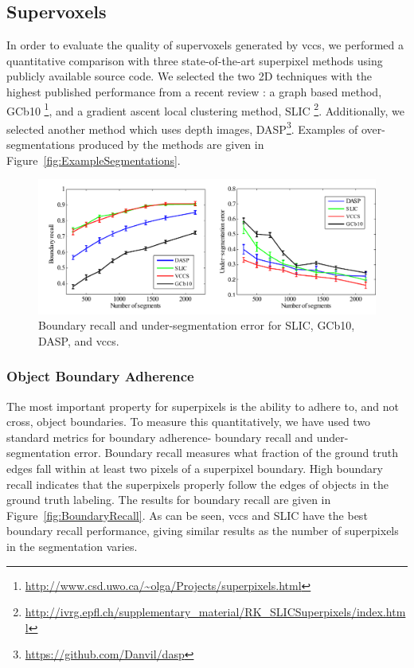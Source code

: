 \subsection {Supervoxels}
\label{sec:Evaluation}
In order to evaluate the quality of supervoxels generated by \gls{vccs}, we performed a quantitative comparison with three state-of-the-art superpixel methods using publicly available source code. 
We selected the two 2D techniques with the highest published performance from a recent review \cite{SLICCompared}: a graph based method, GCb10 \cite{SuperpixelsSupervoxels}\footnote{\url{http://www.csd.uwo.ca/~olga/Projects/superpixels.html}}, and a gradient ascent local clustering method, SLIC \cite{SLICCompared}\footnote{\url{http://ivrg.epfl.ch/supplementary_material/RK_SLICSuperpixels/index.html}}.
Additionally, we selected another method which uses depth images, DASP\cite{DASP}\footnote{\url{https://github.com/Danvil/dasp}}.
Examples of over-segmentations produced by the methods are given in Figure~\ref{fig:ExampleSegmentations}.
\begin{figure}
\begin{center}
\includegraphics[width=0.95\linewidth]{figures/CVPR2013/Performance.pdf}
\end{center}
   \caption[Boundary Recall \& Undersegmentation Error]{Boundary recall and under-segmentation error for SLIC, GCb10, DASP, and \gls{vccs}.}
\label{fig:BoundaryRecall}
\label{fig:UndersegError}
\end{figure}
\subsubsection{Object Boundary Adherence}
The most important property for superpixels is the ability to adhere to, and not cross, object boundaries. To measure this quantitatively, we have used two standard metrics for boundary adherence- boundary recall and under-segmentation error\cite{Turbopixels, SuperpixelsSupervoxels}. Boundary recall measures what fraction of the ground truth edges fall within at least two pixels of a superpixel boundary. High boundary recall indicates that the superpixels properly follow the edges of objects in the ground truth labeling. The results for boundary recall are given in Figure~\ref{fig:BoundaryRecall}. As can be seen, \gls{vccs} and SLIC have the best boundary recall performance, giving similar results as the number of superpixels in the segmentation varies. 

